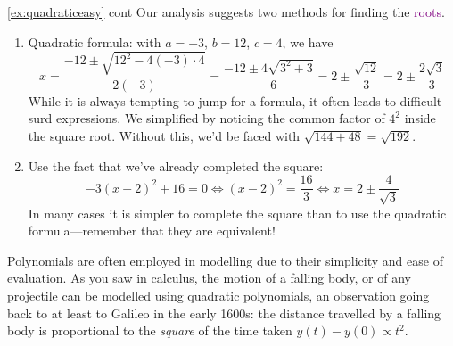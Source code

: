 \begin{example*}{\ref{ex:quadraticeasy} cont}{}
	Our analysis suggests two methods for finding the \textcolor{purple}{roots}.
	\begin{enumerate}
	  \item Quadratic formula: with $a=-3$, $b=12$, $c=4$, we have
	  \[
	  	x=\dfrac{-12\pm\sqrt{12^2-4(-3)\cdot 4}}{2(-3)} =\dfrac{-12\pm 4\sqrt{3^2+3}}{-6} =2\pm\dfrac{\sqrt{12}}{3} =2\pm\dfrac{2\sqrt{3}}{3}
	  \]
	  While it is always tempting to jump for a formula, it often leads to difficult surd expressions. We simplified by noticing the common factor of $4^2$ inside the square root. Without this, we'd be faced with $\sqrt{144+48}=\sqrt{192}$.
	  \item Use the fact that we've already completed the square:
	  \[
	  	-3(x-2)^2+16=0\iff (x-2)^2=\frac{16}3\iff x=2\pm\frac 4{\sqrt 3}
	  \]
	  In many cases it is simpler to complete the square than to use the quadratic formula---remember that they are equivalent!
	\end{enumerate}
\end{example*}


Polynomials are often employed in modelling due to their simplicity and ease of evaluation. As you saw in calculus, the motion of a falling body, or of any projectile can be modelled using quadratic polynomials, an observation going back to at least to Galileo in the early 1600s: the distance travelled by a falling body is proportional to the \emph{square} of the time taken $y(t)-y(0)\propto t^2$.

